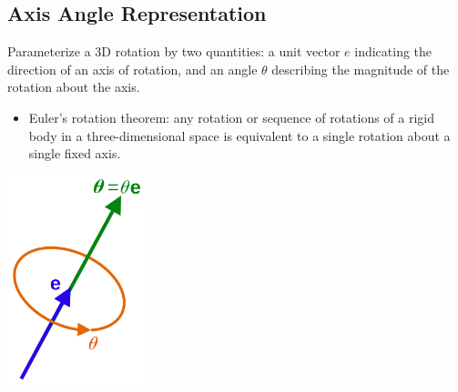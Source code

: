 \documentclass[10pt]{article}
\begin{document}
\subsection*{Axis Angle Representation}
Parameterize a 3D rotation by two quantities: a unit vector $e$ indicating the direction of an axis of rotation, and an angle $\theta$ describing the magnitude of the rotation about the axis.
\begin{itemize}
	\item Euler's rotation theorem: any rotation or sequence of rotations of a rigid body in a three-dimensional space is equivalent to a single rotation about a single fixed axis.
\end{itemize}
\begin{center} 
	\includegraphics*[width=0.3\textwidth]{L1_15.png} 
\end{center}
\end{document}
